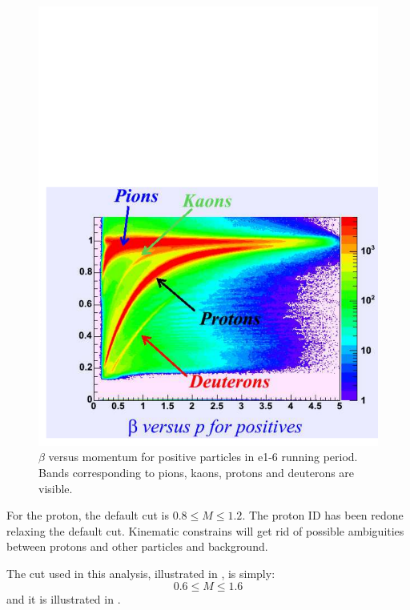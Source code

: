 \cia
\begin{figure}[h]
 \includegraphics[width = 13cm, bb=20 0 600 740]{data_reduction/img/beta_vs_mom}
 \caption[$\beta$ versus momentum for positive particles in e1-6 running period]
         { $\beta$ versus momentum for positive particles in e1-6 running period. Bands
                    corresponding to pions, kaons, protons and deuterons are visible.}
 \label{fig:betavsmom}
\end{figure}

For the proton, the default cut is  $ 0.8 \le M \le 1.2$.
The proton ID has been redone relaxing the default cut. 
Kinematic constrains will get rid of possible ambiguities between protons and 
other particles and background.

The cut used in this analysis, illustrated in , is simply:
$$
 0.6 \le M \le 1.6
$$
and it is illustrated in .

